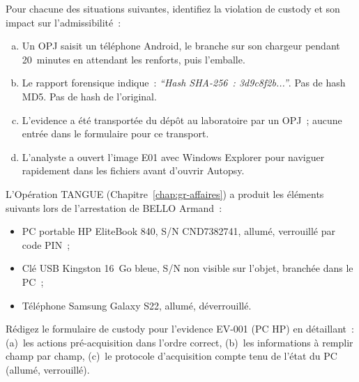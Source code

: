 \begin{boxexo}[title={\ding{45}\quad Exercice~8.1. Diagnostic de custody \niveaubase}]
Pour chacune des situations suivantes, identifiez la violation de custody
et son impact sur l'admissibilité~:
\begin{enumerate}[(a)]
    \item Un OPJ saisit un téléphone Android, le branche sur son chargeur
          pendant 20~minutes en attendant les renforts, puis l'emballe.
    \item Le rapport forensique indique~: \textit{``Hash SHA-256~:
          3d9c8f2b...''}. Pas de hash MD5. Pas de hash de l'original.
    \item L'evidence a été transportée du dépôt au laboratoire par un
          OPJ~; aucune entrée dans le formulaire pour ce transport.
    \item L'analyste a ouvert l'image E01 avec Windows Explorer pour
          naviguer rapidement dans les fichiers avant d'ouvrir Autopsy.
\end{enumerate}
\end{boxexo}

\begin{boxexo}[title={\ding{45}\quad Exercice~8.2. Remplissage de formulaire \niveaumoyen}]
L'Opération TANGUE (Chapitre~\ref{chap:gr-affaires}) a produit les
éléments suivants lors de l'arrestation de BELLO Armand~:
\begin{itemize}
    \item PC portable HP EliteBook 840, S/N CND7382741, allumé,
          verrouillé par code PIN~;
    \item Clé USB Kingston 16~Go bleue, S/N non visible sur l'objet,
          branchée dans le PC~;
    \item Téléphone Samsung Galaxy S22, allumé, déverrouillé.
\end{itemize}
Rédigez le formulaire de custody pour l'evidence EV-001 (PC HP) en
détaillant~: (a)~les actions pré-acquisition dans l'ordre correct,
(b)~les informations à remplir champ par champ, (c)~le protocole
d'acquisition compte tenu de l'état du PC (allumé, verrouillé).
\end{boxexo}

